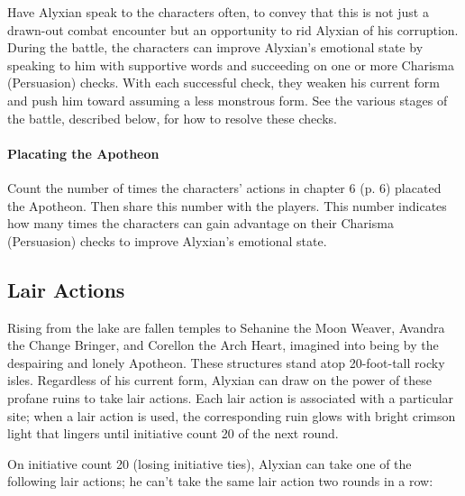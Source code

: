\documentclass[a4paper, 11pt, bg=full, twocolumn, nooutline]{dndbook}
\begin{document}
Have Alyxian speak to the characters often, to convey that this is not just a drawn-out combat encounter but an opportunity to rid Alyxian of his corruption. During the battle, the characters can improve Alyxian's emotional state by speaking to him with supportive words and succeeding on one or more Charisma (Persuasion) checks. With each successful check, they weaken his current form and push him toward assuming a less monstrous form. See the various stages of the battle, described below, for how to resolve these checks.

\paragraph{Placating the Apotheon}

Count the number of times the characters' actions in chapter 6 (p. 6) placated the Apotheon. Then share this number with the players. This number indicates how many times the characters can gain advantage on their Charisma (Persuasion) checks to improve Alyxian's emotional state.


\subsection{Lair Actions}

Rising from the lake are fallen temples to Sehanine the Moon Weaver, Avandra the Change Bringer, and Corellon the Arch Heart, imagined into being by the despairing and lonely Apotheon. These structures stand atop 20-foot-tall rocky isles. Regardless of his current form, Alyxian can draw on the power of these profane ruins to take lair actions. Each lair action is associated with a particular site; when a lair action is used, the corresponding ruin glows with bright crimson light that lingers until initiative count 20 of the next round.

On initiative count 20 (losing initiative ties), Alyxian can take one of the following lair actions; he can't take the same lair action two rounds in a row:
\end{document}
